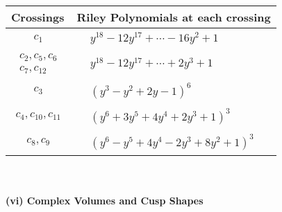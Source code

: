 \documentclass[1p]{elsarticle_modified}
\theoremstyle{definition}
\begin{document}
\begin{tabular}{m{50pt}|m{274pt}}
Crossings & \hspace{64pt}Riley Polynomials at each crossing \\
\hline $$\begin{aligned}c_{1}\end{aligned}$$&$\begin{aligned}
&y^{18}-12 y^{17}+\cdots-16 y^2+1
\end{aligned}$\\
\hline $$\begin{aligned}c_{2},c_{5},c_{6}\\c_{7},c_{12}\end{aligned}$$&$\begin{aligned}
&y^{18}-12 y^{17}+\cdots+2 y^3+1
\end{aligned}$\\
\hline $$\begin{aligned}c_{3}\end{aligned}$$&$\begin{aligned}
&(y^3- y^2+2 y-1)^6
\end{aligned}$\\
\hline $$\begin{aligned}c_{4},c_{10},c_{11}\end{aligned}$$&$\begin{aligned}
&(y^6+3 y^5+4 y^4+2 y^3+1)^3
\end{aligned}$\\
\hline $$\begin{aligned}c_{8},c_{9}\end{aligned}$$&$\begin{aligned}
&(y^6- y^5+4 y^4-2 y^3+8 y^2+1)^3
\end{aligned}$\\
\hline
\end{tabular}\\~\\
\newpage\flushleft \textbf{(vi) Complex Volumes and Cusp Shapes}
\end{document}
